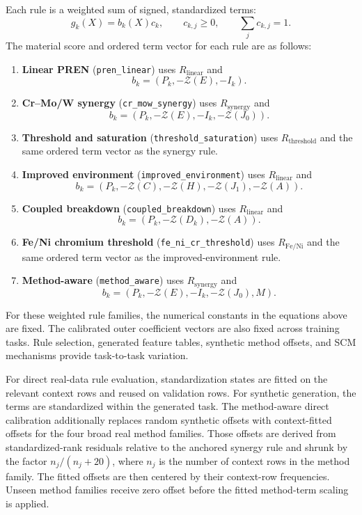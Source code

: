 \documentclass{article}
\begin{document}
Each rule is a weighted sum of signed, standardized terms:
\begin{equation}
g_k(X)=b_k(X)c_k,
\qquad c_{k,j}\geq0,\qquad\sum_jc_{k,j}=1.
\label{eq:rule-vector}
\end{equation}
The material score and ordered term vector for each rule are as follows:
\begin{enumerate}
    \item \textbf{Linear PREN} (\texttt{pren\_linear}) uses
    \(R_{\mathrm{linear}}\) and
    \[
    b_k=(P_k,-\mathcal{Z}(E),-I_k).
    \]
    \item \textbf{Cr--Mo/W synergy} (\texttt{cr\_mow\_synergy}) uses
    \(R_{\mathrm{synergy}}\) and
    \[
    b_k=(P_k,-\mathcal{Z}(E),-I_k,-\mathcal{Z}(J_0)).
    \]
    \item \textbf{Threshold and saturation}
    (\texttt{threshold\_saturation}) uses \(R_{\mathrm{threshold}}\) and
    the same ordered term vector as the synergy rule.
    \item \textbf{Improved environment}
    (\texttt{improved\_environment}) uses \(R_{\mathrm{linear}}\) and
    \[
    b_k=(P_k,-\mathcal{Z}(C),-\mathcal{Z}(H),
                 -\mathcal{Z}(J_1),-\mathcal{Z}(A)).
    \]
    \item \textbf{Coupled breakdown} (\texttt{coupled\_breakdown}) uses
    \(R_{\mathrm{linear}}\) and
    \[
    b_k=(P_k,-\mathcal{Z}(D_k),-\mathcal{Z}(A)).
    \]
    \item \textbf{Fe/Ni chromium threshold}
    (\texttt{fe\_ni\_cr\_threshold}) uses \(R_{\mathrm{Fe/Ni}}\) and
    the same ordered term vector as the improved-environment rule.
    \item \textbf{Method-aware} (\texttt{method\_aware}) uses
    \(R_{\mathrm{synergy}}\) and
    \[
    b_k=(P_k,-\mathcal{Z}(E),-I_k,-\mathcal{Z}(J_0),M).
    \]
\end{enumerate}

For these weighted rule families, the numerical constants in the equations
above are fixed. The calibrated outer coefficient vectors are also fixed
across training tasks. Rule selection, generated feature tables, synthetic
method offsets, and SCM mechanisms provide task-to-task variation.

For direct real-data rule evaluation, standardization states are fitted on
the relevant context rows and reused on validation rows. For synthetic
generation, the terms are standardized within the generated task. The
method-aware direct calibration additionally replaces random synthetic
offsets with context-fitted offsets for the four broad real method families.
Those offsets are derived from standardized-rank residuals relative to the
anchored synergy rule and shrunk by the factor \(n_j/(n_j+20)\), where
\(n_j\) is the number of context rows in the method family. The fitted offsets
are then centered by their context-row frequencies. Unseen method families
receive zero offset before the fitted method-term scaling is applied.
\end{document}
